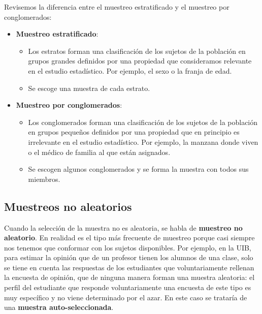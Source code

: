 \documentclass[
  spanish,
  letterpaper,
  DIV=11,
  numbers=noendperiod]{scrreprt}
\begin{document}
\begin{tcolorbox}[enhanced jigsaw, arc=.35mm, bottomrule=.15mm, bottomtitle=1mm, breakable, colback=white, colbacktitle=quarto-callout-note-color!10!white, colframe=quarto-callout-note-color-frame, coltitle=black, left=2mm, leftrule=.75mm, opacityback=0, opacitybacktitle=0.6, rightrule=.15mm, title=\textcolor{quarto-callout-note-color}{\faInfo}\hspace{0.5em}{Nota}, titlerule=0mm, toprule=.15mm, toptitle=1mm]

Revisemos la diferencia entre el muestreo estratificado y el muestreo
por conglomerados:

\begin{itemize}
\item
  \textbf{Muestreo estratificado}:

  \begin{itemize}
  \item
    Los estratos forman una clasificación de los sujetos de la población
    en grupos grandes definidos por una propiedad que consideramos
    relevante en el estudio estadístico. Por ejemplo, el sexo o la
    franja de edad.
  \item
    Se escoge una muestra de cada estrato.
  \end{itemize}
\item
  \textbf{Muestreo por conglomerados}:

  \begin{itemize}
  \item
    Los conglomerados forman una clasificación de los sujetos de la
    población en grupos pequeños definidos por una propiedad que en
    principio es irrelevante en el estudio estadístico. Por ejemplo, la
    manzana donde viven o el médico de familia al que están asignados.
  \item
    Se escogen algunos conglomerados y se forma la muestra con todos sus
    miembros.
  \end{itemize}
\end{itemize}

\end{tcolorbox}

\subsection{Muestreos no aleatorios}\label{muestreos-no-aleatorios}

Cuando la selección de la muestra no es aleatoria, se habla de
\textbf{muestreo no aleatorio}. En realidad es el tipo más frecuente de
muestreo porque casi siempre nos tenemos que conformar con los sujetos
disponibles. Por ejemplo, en la UIB, para estimar la opinión que de un
profesor tienen los alumnos de una clase, solo se tiene en cuenta las
respuestas de los estudiantes que voluntariamente rellenan la encuesta
de opinión, que de ninguna manera forman una muestra aleatoria: el
perfil del estudiante que responde voluntariamente una encuesta de este
tipo es muy específico y no viene determinado por el azar. En este caso
se trataría de una \textbf{muestra auto-seleccionada}.
\end{document}
